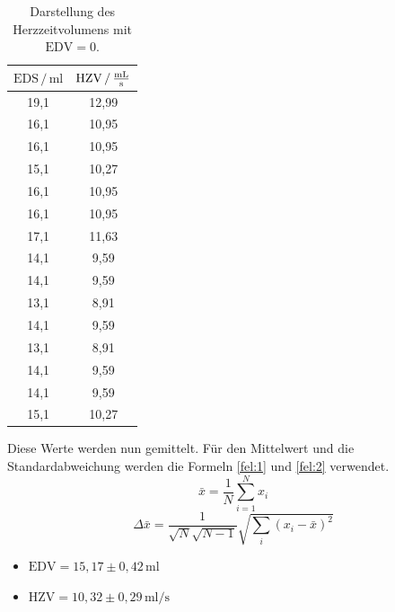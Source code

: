 \begin{table}[H]
  \centering
  \caption{Darstellung des Herzzeitvolumens mit $\text{EDV} =0$.}
  \label{tab:7}
  \begin{tabular}{c c}
    \toprule
     $\text{EDS}\,/\,\si{\milli\litre}$ &
     $\text{HZV} \,/\, \si[per-mode=fraction]{\milli\litre\per\second}$ \\
     \midrule
      19,1 & 12,99 \\
      16,1 & 10,95\\
      16,1 & 10,95\\
      15,1 & 10,27\\
      16,1 & 10,95\\
      16,1 & 10,95\\
      17,1 & 11,63\\
      14,1 & 9,59\\
      14,1 & 9,59\\
      13,1 & 8,91\\
      14,1 & 9,59\\
      13,1 & 8,91\\
      14,1 & 9,59\\
      14,1 & 9,59\\
      15,1 & 10,27\\
     \bottomrule
  \end{tabular}
\end{table}
Diese Werte werden nun gemittelt.
Für den Mittelwert und die Standardabweichung werden die Formeln \ref{fel:1} und \ref{fel:2} verwendet.
\begin{equation}
    \bar{x} = \frac{1}{N} \sum_{i=1}^{N} x_i
    \label{fel:1}
\end{equation}
\begin{equation}
  \Delta \bar{x} = \frac{1}{\sqrt{N}\sqrt{N-1}} \sqrt{\sum_{i}(x_i-\bar{x})^2}
  \label{fel:2}
\end{equation}

\begin{itemize}
  \item $\text{EDV} = 15,17 \pm 0,42\, \si{\milli\litre}$
  \item $\text{HZV} = 10,32 \pm 0,29\, \si{\milli\litre\per\second}$
\end{itemize}
